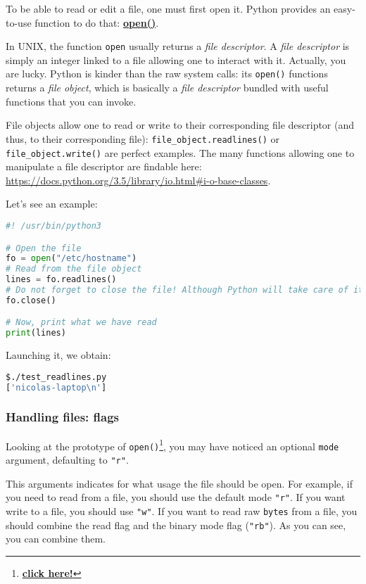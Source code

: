 \documentclass[12pt]{article}
\let\oldhref\href
\renewcommand{\href}[2]{\oldhref{#1}{\bfseries#2}}
\begin{document}
To be able to read or edit a file, one must first open it. Python provides an easy-to-use function to do that: \href{https://docs.python.org/3/library/functions.html\#open}{open()}.

In UNIX, the function \texttt{open} usually returns a \textit{file descriptor}. A \textit{file descriptor} is simply an integer linked to a file allowing one to interact with it.
Actually, you are lucky. Python is kinder than the raw system calls: its \texttt{open()} functions returns a \textit{file object}, which is basically a \textit{file descriptor} bundled with useful functions that you can invoke.

File objects allow one to read or write to their corresponding file descriptor (and thus, to their corresponding file): \texttt{file\_object.readlines()} or \texttt{file\_object.write()} are perfect examples.
The many functions allowing one to manipulate a file descriptor are findable here: \url{https://docs.python.org/3.5/library/io.html\#i-o-base-classes}.

Let's see an example:

\begin{lstlisting}[language=python,style=codestyle,title=test\_readlines.py]
#! /usr/bin/python3

# Open the file
fo = open("/etc/hostname")
# Read from the file object
lines = fo.readlines()
# Do not forget to close the file! Although Python will take care of it if you forget in most cases, it is generally bad to keep file descriptors hanging for no reason
fo.close()

# Now, print what we have read
print(lines)
\end{lstlisting}

Launching it, we obtain:

\begin{lstlisting}[language=bash]
$./test_readlines.py
['nicolas-laptop\n']
\end{lstlisting}

\subsubsection{Handling files: flags}

Looking at the prototype of \texttt{open()}\footnote{\href{https://docs.python.org/3/library/functions.html\#open}{click here!}}, you may have noticed an optional \texttt{mode} argument, defaulting to \texttt{"r"}.

This arguments indicates for what usage the file should be open.
For example, if you need to read from a file, you should use the default mode \texttt{"r"}. If you want write to a file, you should use \texttt{"w"}. If you want to read raw \texttt{bytes} from a file, you should combine the read flag and the binary mode flag (\texttt{"rb"}).
As you can see, you can combine them.
\end{document}

